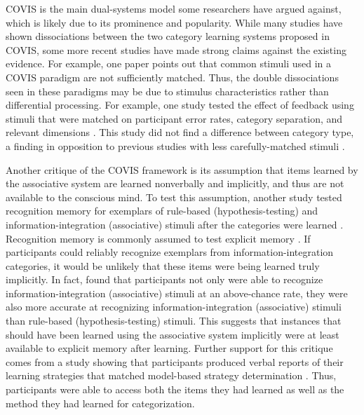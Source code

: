 \documentclass[../dissertation.tex]{subfiles}
\begin{document}
COVIS is the main dual-systems model some researchers have argued against, which is likely due to its prominence and popularity. While many studies have shown dissociations between the two category learning systems proposed in COVIS, some more recent studies have made strong claims against the existing evidence. For example, one paper points out that common stimuli used in a COVIS paradigm are not sufficiently matched. Thus, the double dissociations seen in these paradigms may be due to stimulus characteristics rather than differential processing. For example, one study tested the effect of feedback using stimuli that were matched on participant error rates, category separation, and relevant dimensions \citep{Edmunds2015}. This study did not find a difference between category type, a finding in opposition to previous studies with less carefully-matched stimuli \citep{Ashby2002, Maddox2003}. \par 
	Another critique of the COVIS framework is its assumption that items learned by the associative system are learned nonverbally and implicitly, and thus are not available to the conscious mind. To test this assumption, another study tested recognition memory for exemplars of rule-based (hypothesis-testing) and information-integration (associative) stimuli after the categories were learned \citep{Edmunds2016}. Recognition memory is commonly assumed to test explicit memory \citep{Gabrieli1995}. If participants could reliably recognize exemplars from information-integration categories, it would be unlikely that these items were being learned truly implicitly. In fact, \citet{Edmunds2016} found that participants not only were able to recognize information-integration (associative) stimuli at an above-chance rate, they were also more accurate at recognizing information-integration (associative) stimuli than rule-based (hypothesis-testing) stimuli. This suggests that instances that should have been learned using the associative system implicitly were at least available to explicit memory after learning. Further support for this critique comes from a study showing that participants produced verbal reports of their learning strategies that matched model-based strategy determination \cite{Edmunds2015}. Thus, participants were able to access both the items they had learned as well as the method they had learned for categorization.  \par 
\end{document}
